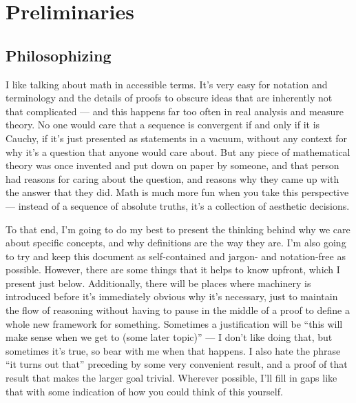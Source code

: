 \documentclass[../analysis.tex]{subfiles}
\begin{document}
\section{Preliminaries}

\subsection{Philosophizing}

I like talking about math in accessible terms. It's very easy for notation and terminology and the details of proofs to obscure ideas that are inherently not that complicated --- and this happens far too often in real analysis and measure theory. No one would care that a sequence is convergent if and only if it is Cauchy, if it's just presented as statements in a vacuum, without any context for why it's a question that anyone would care about. But any piece of mathematical theory was once invented and put down on paper by someone, and that person had reasons for caring about the question, and reasons why they came up with the answer that they did. Math is much more fun when you take this perspective --- instead of a sequence of absolute truths, it's a collection of aesthetic decisions. 

To that end, I'm going to do my best to present the thinking behind why we care about specific concepts, and why definitions are the way they are. I'm also going to try and keep this document as self-contained and jargon- and notation-free as possible. However, there are some things that it helps to know upfront, which I present just below. Additionally, there will be places where machinery is introduced before it's immediately obvious why it's necessary, just to maintain the flow of reasoning without having to pause in the middle of a proof to define a whole new framework for something. Sometimes a justification will be ``this will make sense when we get to (some later topic)'' --- I don't like doing that, but sometimes it's true, so bear with me when that happens. I also hate the phrase ``it turns out that'' preceding by some very convenient result, and a proof of that result that makes the larger goal trivial. Wherever possible, I'll fill in gaps like that with some indication of how you could think of this yourself.
\end{document}
